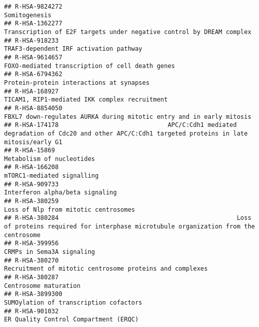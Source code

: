 \documentclass[
]{article}
\begin{document}
\begin{verbatim}
## R-HSA-9824272                                                                                                                        Somitogenesis
## R-HSA-1362277                                                                 Transcription of E2F targets under negative control by DREAM complex
## R-HSA-918233                                                                                                TRAF3-dependent IRF activation pathway
## R-HSA-9614657                                                                                      FOXO-mediated transcription of cell death genes
## R-HSA-6794362                                                                                             Protein-protein interactions at synapses
## R-HSA-168927                                                                                         TICAM1, RIP1-mediated IKK complex recruitment
## R-HSA-8854050                                                                 FBXL7 down-regulates AURKA during mitotic entry and in early mitosis
## R-HSA-174178                              APC/C:Cdh1 mediated degradation of Cdc20 and other APC/C:Cdh1 targeted proteins in late mitosis/early G1
## R-HSA-15869                                                                                                              Metabolism of nucleotides
## R-HSA-166208                                                                                                            mTORC1-mediated signalling
## R-HSA-909733                                                                                                       Interferon alpha/beta signaling
## R-HSA-380259                                                                                                  Loss of Nlp from mitotic centrosomes
## R-HSA-380284                                                 Loss of proteins required for interphase microtubule organization from the centrosome
## R-HSA-399956                                                                                                             CRMPs in Sema3A signaling
## R-HSA-380270                                                                              Recruitment of mitotic centrosome proteins and complexes
## R-HSA-380287                                                                                                                 Centrosome maturation
## R-HSA-3899300                                                                                               SUMOylation of transcription cofactors
## R-HSA-901032                                                                                                 ER Quality Control Compartment (ERQC)

\end{verbatim}
\end{document}
